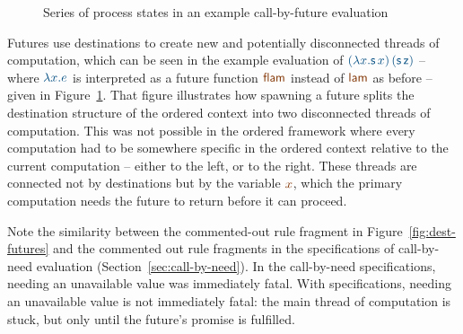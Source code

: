 \begin{figure}
\begin{center}
\end{center}
\caption{Series of process states in an example call-by-future evaluation}
\label{fig:examplefuturefunciton}
\end{figure}

Futures use destinations to create new and potentially disconnected
threads of computation, which can be seen in the example evaluation of
$\obj{(\lambda x. {\sf s}\,x)\,({\sf s}\,{\sf z})}$ -- where
$\obj{\lambda x.e}$ is interpreted as a future function $\lf{\sf
  flam}$ instead of $\lf{\sf lam}$ as before -- given in
Figure~\ref{fig:examplefuturefunciton}. That figure illustrates how
spawning a future splits the destination structure of the ordered
context into two disconnected threads of computation.  This was not
possible in the ordered framework where every computation had to be
somewhere specific in the ordered context relative to the current
computation -- either to the left, or to the right. These threads are
connected not by destinations but by the variable $\lf x$, which the
primary computation needs the future to return before it can proceed.

Note the similarity between the commented-out rule fragment in
Figure~\ref{fig:dest-futures} and the commented out rule fragments in
the specifications of call-by-need evaluation
(Section~\ref{sec:call-by-need}). In the call-by-need specifications,
needing an unavailable value was immediately fatal. With
specifications, needing an unavailable value is not immediately fatal:
the main thread of computation is stuck, but only until the future's
promise is fulfilled.

